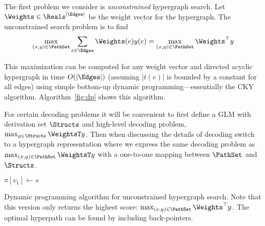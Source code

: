 

The first problem we consider is {\em unconstrained} hypergraph search.
Let $\Weights \in \Reals^{|{\Edges}|}$  be the weight vector for the hypergraph.
The unconstrained search problem is to find
\[ \max_{(x,y) \in \PathSet} \sum_{e \in \Edges} \Weights(e) y(e) = \max_{(x,y) \in \PathSet} \Weights^\top y  \]


This maximization can be computed for any weight vector and directed
acyclic hypergraph in time $O(|\Edges|)$ (assuming $|t(e)|$ is bounded
by a constant for all edges) using simple bottom-up dynamic
programming---essentially the CKY algorithm.  Algorithm~\ref{fig:dp}
shows this algorithm.

For certain decoding problems it will be convenient to first define a GLM with derivation set $\Structs$ and high-level decoding problem, $\max_{y \in \Structs} \WeightsT y$. Then when discussing the details of decoding switch to a hypergraph representation where we express the same decoding problem as
$ \max_{(x,y) \in \PathSet} \WeightsT y$ with a one-to-one mapping between $\PathSet$ and $\Structs$. 


\begin{Algorithm}[h]{10cm}
\begin{algorithmic}
 $\pi[v_1] \gets s$
\EndIf{}
\EndFor{}
\State{\Return{$\pi[\Root]$}}
\EndProcedure{}
\end{algorithmic}
\caption{Dynamic programming algorithm for unconstrained hypergraph search. Note that this version only returns the highest score: $\max_{(x,y) \in \PathSet} \Weights^\top y$. The optimal hyperpath can be found by including back-pointers.}
\label{fig:dp}
\end{Algorithm}


